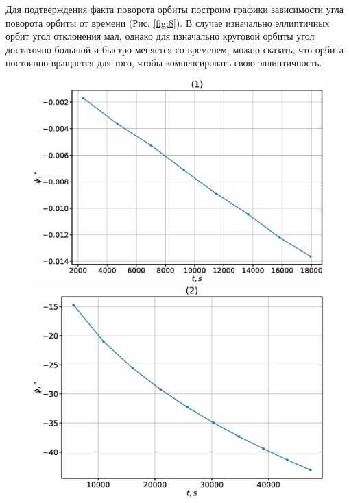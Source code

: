 \documentclass[12pt]{article}
\begin{document}
Для подтверждения факта поворота орбиты построим графики зависимости угла поворота орбиты от времени (Рис. \ref{fig:8}). В случае изначально
эллиптичных орбит угол отклонения мал, однако для изначально круговой орбиты угол достаточно большой и быстро меняется со временем, можно сказать,
что орбита постоянно вращается для того, чтобы компенсировать свою эллиптичность.
\begin{figure}[H]
      \includegraphics[width=1.0\linewidth]{phi_t_1.eps}
    \endminipage\hfill
      \includegraphics[width=1.0\linewidth]{phi_t_2.eps}
    \endminipage\hfill

\end{figure}
\end{document}
